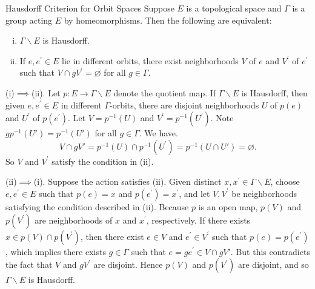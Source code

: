 \documentclass{report}
\begin{document}
\begin{proposition}{Hausdorff Criterion for Orbit Spaces}{}
	 Suppose $E$ is a topological space and $\Gamma$ is a group acting $E$ by homeomorphisms. Then the following are equivalent:
	 \begin{enumerate}[(i)]
		\item $\Gamma \backslash E$ is Hausdorff.
		\item If $e, e^{\prime} \in E$ lie in different orbits, there exist neighborhoods $V$
		of $e$ and $V^{\prime}$ of $e^{\prime}$ such that $V \cap g  V^{\prime} =\varnothing$ for all $g \in \Gamma$.
	\end{enumerate}
\end{proposition}
\begin{prf}
	(i)$\implies$(ii). Let $p: E \rightarrow \Gamma\backslash E$ denote the quotient map. If $\Gamma\backslash E$ is Hausdorff, then given $e, e^{\prime}\in E$ in different $\Gamma$-orbits, there are disjoint neighborhoods $U$ of $p(e)$ and $U^{\prime}$ of $p\left(e^{\prime}\right)$. Let $V=p^{-1}(U)$ and $V^{\prime}=p^{-1}\left(U^{\prime}\right)$. Note $g p^{-1}(U')=p^{-1}(U')$ for all $g \in \Gamma$. We have.
	\[
		V\cap gV'= p^{-1}(U)\cap p^{-1}\left(U^{\prime}\right)=p^{-1}\left(U\cap U'\right)=\varnothing.
	\]
	So $V$ and $V^{\prime}$ satisfy the condition in (ii).

	(ii)$\implies$(i). Suppose the action satisfies (ii). Given distinct $x, x^{\prime} \in\Gamma\backslash E$, choose $e, e^{\prime} \in E$ such that $p(e)=x$ and $p\left(e^{\prime}\right)=x^{\prime}$, and let $V, V^{\prime}$ be neighborhoods satisfying the condition described in (ii). Because $p$ is an open map, $p(V)$ and $p\left(V^{\prime}\right)$ are neighborhoods of $x$ and $x^{\prime}$, respectively. If there exists $x\in p(V)\cap p\left(V^{\prime}\right)$, then there exist $e\in V$ and $e^{\prime}\in V^{\prime}$ such that $p(e)=p\left(e^{\prime}\right)$, which implies there exists $g\in \Gamma$ such that $e=g e^{\prime}\in V\cap gV'$. But this contradicts the fact that $V$ and $gV^{\prime}$ are disjoint. Hence $p(V)$ and $p\left(V^{\prime}\right)$ are disjoint, and so $\Gamma\backslash E$ is Hausdorff.
\end{prf}
\end{document}
